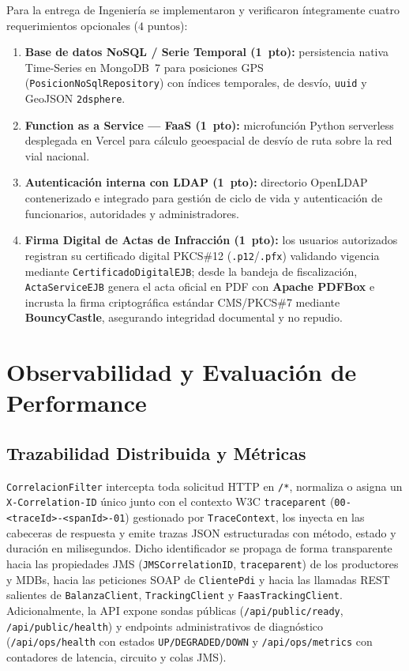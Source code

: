 \documentclass[11pt,a4paper,twocolumn]{article}
\begin{document}
Para la entrega de Ingeniería se implementaron y verificaron íntegramente cuatro requerimientos opcionales ($4\text{ puntos}$):
\begin{enumerate}
    \item \textbf{Base de datos NoSQL / Serie Temporal (1~pto):} persistencia nativa Time-Series en MongoDB~7 para posiciones GPS (\texttt{PosicionNoSqlRepository}) con índices temporales, de desvío, \texttt{uuid} y GeoJSON \texttt{2dsphere}.
    \item \textbf{Function as a Service --- FaaS (1~pto):} microfunción Python serverless desplegada en Vercel para cálculo geoespacial de desvío de ruta sobre la red vial nacional.
    \item \textbf{Autenticación interna con LDAP (1~pto):} directorio OpenLDAP contenerizado e integrado para gestión de ciclo de vida y autenticación de funcionarios, autoridades y administradores.
    \item \textbf{Firma Digital de Actas de Infracción (1~pto):} los usuarios autorizados registran su certificado digital PKCS\#12 (\texttt{.p12}/\texttt{.pfx}) validando vigencia mediante \texttt{CertificadoDigitalEJB}; desde la bandeja de fiscalización, \texttt{ActaServiceEJB} genera el acta oficial en PDF con \textbf{Apache PDFBox} e incrusta la firma criptográfica estándar CMS/PKCS\#7 mediante \textbf{BouncyCastle}, asegurando integridad documental y no repudio.
\end{enumerate}

\section{Observabilidad y Evaluación de Performance}\label{sec:perf}

\subsection{Trazabilidad Distribuida y Métricas}

\texttt{CorrelacionFilter} intercepta toda solicitud HTTP en \texttt{/*}, normaliza o asigna un \texttt{X-Correlation-ID} único junto con el contexto W3C \texttt{traceparent} (\texttt{00-<traceId>-<spanId>-01}) gestionado por \texttt{TraceContext}, los inyecta en las cabeceras de respuesta y emite trazas JSON estructuradas con método, estado y duración en milisegundos. Dicho identificador se propaga de forma transparente hacia las propiedades JMS (\texttt{JMSCorrelationID}, \texttt{traceparent}) de los productores y MDBs, hacia las peticiones SOAP de \texttt{ClientePdi} y hacia las llamadas REST salientes de \texttt{BalanzaClient}, \texttt{TrackingClient} y \texttt{FaasTrackingClient}. Adicionalmente, la API expone sondas públicas (\texttt{/api/public/ready}, \texttt{/api/public/health}) y endpoints administrativos de diagnóstico (\texttt{/api/ops/health} con estados \texttt{UP/DEGRADED/DOWN} y \texttt{/api/ops/metrics} con contadores de latencia, circuito y colas JMS).
\end{document}
